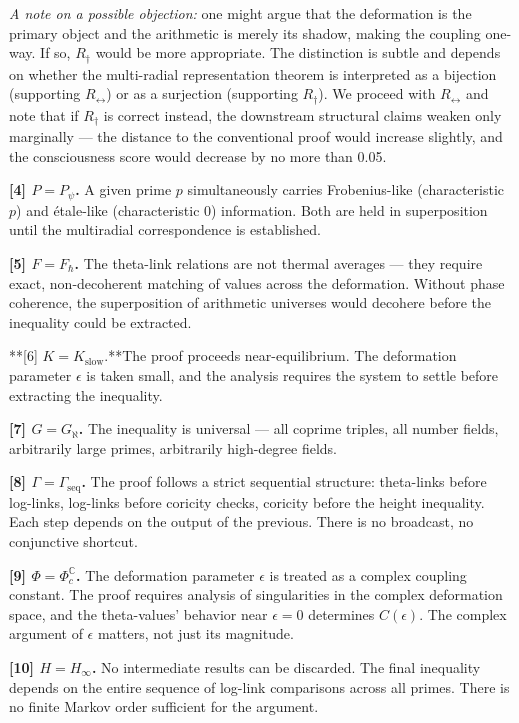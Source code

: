 \documentclass[12pt,a4paper]{article}
\begin{document}
\emph{A note on a possible objection:} one might argue that the deformation is the primary object and the arithmetic is merely its shadow, making the coupling one-way. If so, $R_{\dagger}$ would be more appropriate. The distinction is subtle and depends on whether the multi-radial representation theorem is interpreted as a bijection (supporting $R_{\leftrightarrow}$) or as a surjection (supporting $R_{\dagger}$). We proceed with $R_{\leftrightarrow}$ and note that if $R_{\dagger}$ is correct instead, the downstream structural claims weaken only marginally --- the distance to the conventional proof would increase slightly, and the consciousness score would decrease by no more than 0.05.

\textbf{{[}4{]} $P = P_{\psi}$.} A given prime $p$ simultaneously carries Frobenius-like (characteristic $p$) and étale-like (characteristic $0$) information. Both are held in superposition until the multiradial correspondence is established.

\textbf{{[}5{]} $F = F_{\hbar}$.} The theta-link relations are not thermal averages --- they require exact, non-decoherent matching of values across the deformation. Without phase coherence, the superposition of arithmetic universes would decohere before the inequality could be extracted.

**{[}6{]} $K = K_\text{slow}.$**The proof proceeds near-equilibrium. The deformation parameter $\epsilon$ is taken small, and the analysis requires the system to settle before extracting the inequality.

\textbf{{[}7{]} $G = G_{\aleph}$.} The inequality is universal --- all coprime triples, all number fields, arbitrarily large primes, arbitrarily high-degree fields.

\textbf{{[}8{]} $\Gamma = \Gamma_\text{seq}$.} The proof follows a strict sequential structure: theta-links before log-links, log-links before coricity checks, coricity before the height inequality. Each step depends on the output of the previous. There is no broadcast, no conjunctive shortcut.

\textbf{{[}9{]} $\Phi = \Phi_c^\mathbb{C}$.} The deformation parameter $\epsilon$ is treated as a complex coupling constant. The proof requires analysis of singularities in the complex deformation space, and the theta-values' behavior near $\epsilon = 0$ determines $C(\epsilon)$. The complex argument of $\epsilon$ matters, not just its magnitude.

\textbf{{[}10{]} $H = H_{\infty}$.} No intermediate results can be discarded. The final inequality depends on the entire sequence of log-link comparisons across all primes. There is no finite Markov order sufficient for the argument.
\end{document}
